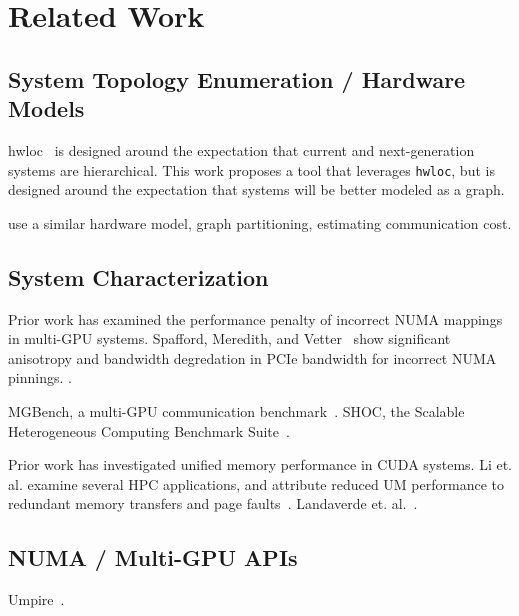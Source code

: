 \chapter{Related Work}
\label{ch:related}


\section{System Topology Enumeration / Hardware Models}

hwloc~\cite{broquedis2010hwloc} is designed around the expectation that current and next-generation systems are hierarchical.
This work proposes a tool that leverages \texttt{hwloc}, but is designed around the expectation that systems will be better modeled as a graph.

\cite{amaral2017topology} use a similar hardware model, graph partitioning, estimating communication cost.

\section{System Characterization}

Prior work has examined the performance penalty of incorrect NUMA mappings in multi-GPU systems.
Spafford, Meredith, and Vetter~\cite{spafford2011quantifying} show significant anisotropy and bandwidth degredation in PCIe bandwidth for incorrect NUMA pinnings. .


MGBench, a multi-GPU communication benchmark~\cite{bennun2016mgbench}.
SHOC, the Scalable Heterogeneous Computing Benchmark Suite~\cite{danalis2010scalable}.


Prior work has investigated unified memory performance in CUDA systems.
Li et. al. examine several HPC applications, and attribute reduced UM performance to redundant memory transfers and page faults~\cite{li2015evaluation}.
Landaverde et. al.~\cite{landaverde2014investigation}.

\section{NUMA / Multi-GPU APIs}

Umpire~\cite{beckingsale2018umpire}.

